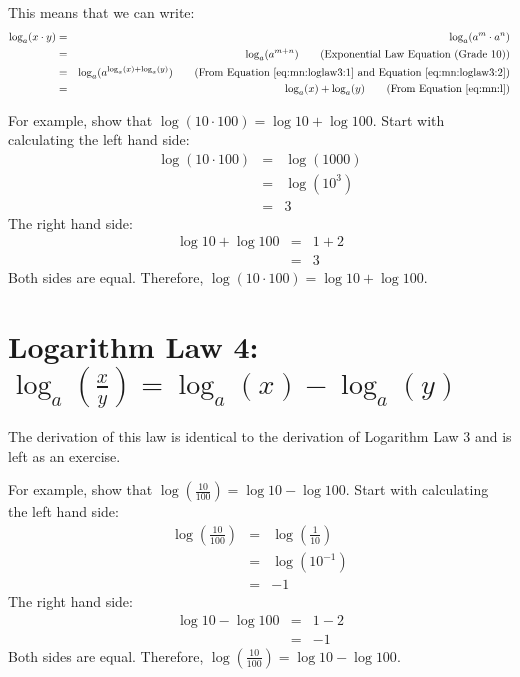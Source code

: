 This means that we can write:
\begin{eqnarray*}
\log_{a}(x \cdot y)&=&\log_{a}(a^m \cdot a^n)\\
&=&\log_{a}(a^{m+n}) \qquad \mbox{(Exponential Law Equation (Grade 10))}\\
&=&\log_{a}(a^{\log_{a}(x)+\log_{a}(y)}) \qquad \mbox{(From Equation~\ref{eq:mn:loglaw3:1} and Equation~\ref{eq:mn:loglaw3:2})}\\
&=&\log_{a}(x)+\log_{a}(y) \qquad \mbox{(From Equation~\ref{eq:mn:l})}
\end{eqnarray*}

For example, show that $\log (10 \cdot 100) = \log 10 + \log 100$. Start with calculating the left hand side:
\begin{eqnarray*}
\log (10 \cdot 100) &=& \log (1000)\\
&=& \log (10^3)\\
&=&3
\end{eqnarray*}
The right hand side:
\begin{eqnarray*}
\log 10 + \log 100 &=& 1 + 2\\
&=&3
\end{eqnarray*}
Both sides are equal. Therefore, $\log (10 \cdot 100) = \log 10 + \log 100$.


\section{Logarithm Law 4: $\log_{a}\left(\frac{x}{y}\right) = \log_{a}(x) - \log_{a}(y)$}

The derivation of this law is identical to the derivation of Logarithm Law 3 and is left as an exercise.

For example, show that $\log (\frac{10}{100}) = \log 10 - \log 100$. Start with calculating the left hand side:
\begin{eqnarray*}
\log \left(\frac{10}{100}\right) &=& \log \left(\frac{1}{10}\right)\\
&=& \log (10^{-1})\\
&=&-1
\end{eqnarray*}
The right hand side:
\begin{eqnarray*}
\log 10 - \log 100 &=& 1 -2 \\
&=&-1
\end{eqnarray*}
Both sides are equal. Therefore, $\log (\frac{10}{100}) = \log 10 - \log 100$.

